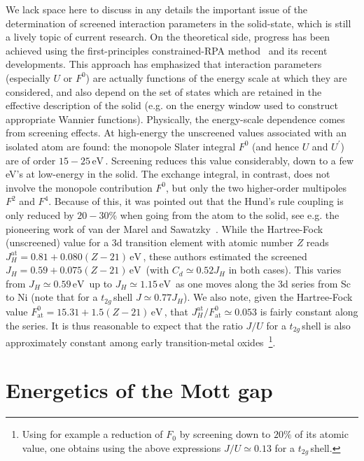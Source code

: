 \documentclass[]{ar2e-changed}%
\def\Up{U^\prime}
\def\eV{\,\mbox{eV}\,}
\def\ttg{$t_{2g}\,$}
\begin{document}
We lack space here to discuss in any details the important issue of the determination of screened 
interaction parameters in the solid-state, which is still a lively topic of current research. 
%
On the theoretical side,  progress has been achieved using the first-principles constrained-RPA 
method~\cite{aryasetiawan_cRPA_prb_2004} and its recent developments. 
%
This approach has emphasized that interaction parameters (especially $U$ or $F^0$) are actually functions 
of the energy scale at which they are considered, and also depend on the set of states which are retained in the 
effective description of the solid (e.g. on the energy window used to construct appropriate Wannier functions). 
%
Physically, the energy-scale dependence comes from screening effects. 
At high-energy the unscreened values associated with an isolated atom are found: 
the monopole Slater integral $F^0$ (and hence $U$ and $\Up$) are of 
order $15-25\eV$. 
%
Screening reduces this value considerably, down to a few eV's at low-energy in the solid. 
%
The exchange integral, in contrast, does not involve the monopole contribution $F^0$, 
but only the two higher-order multipoles $F^2$ and $F^4$. 
%
Because of this, it was pointed out that the Hund's rule coupling  
is only reduced by $20-30$\% when going from the atom to the solid,  
see e.g. the pioneering work of van der Marel and Sawatzky~\cite{vandermarel_sawatzky_prb_1988,vandermarel_phd_1985}. 
%
While the Hartree-Fock (unscreened) value for a 3d transition element with atomic number $Z$ reads 
$J_H^{\mathrm{at}}=0.81+0.080(Z-21)\eV$, these authors estimated 
the screened  $J_H=0.59+0.075 (Z-21)\eV$ (with $C_d\simeq 0.52 J_H$ in both cases). 
%
This varies from $J_H\simeq 0.59\eV$ up to $J_H\simeq 1.15\eV$ as one moves along the 3d series from Sc to Ni 
(note that for a \ttg shell $J\simeq 0.77 J_H$). 
%
We also note, given the Hartree-Fock value $F^0_{\mathrm{at}}=15.31+1.5(Z-21)\eV$,  that 
$J_H^{\mathrm{at}}/F^0_{\mathrm{at}}\simeq 0.053$ is fairly constant along the series.
%
It is thus reasonable to expect that the ratio $J/U$ %
for a \ttg shell  
is also approximately constant among early transition-metal oxides~\footnote{Using for example a reduction 
of $F_0$ by screening down to $20\%$ of its atomic value, 
one obtains using the above expressions $J/U\simeq 0.13$ for a \ttg shell.}. 

\section{Energetics of the Mott gap}
\label{sec:mottgap} 
\end{document}
